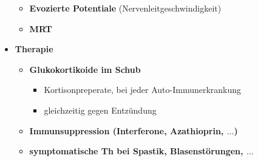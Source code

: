 \begin{itemize}
\begin{itemize}
					\item \textbf{Evozierte Potentiale} (Nervenleitgeschwindigkeit)
					\item \textbf{MRT}
				\end{itemize}
			\item \textbf{Therapie}
				\begin{itemize}
					\item \textbf{Glukokortikoide im Schub} 
						\begin{itemize}
							\item Kortisonpreperate, bei jeder Auto-Immunerkrankung
							\item gleichzeitig gegen Entzündung
						\end{itemize}
					\item \textbf{Immunsuppression (Interferone, Azathioprin, $\dots$)}
					\item \textbf{symptomatische Th bei Spastik, Blasenstörungen, $\dots$}
				\end{itemize}
		\end{itemize}
	

